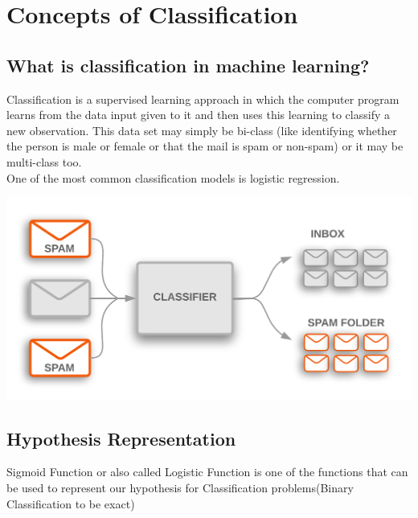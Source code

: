 \documentclass{42-en}
\begin{document}

\chapter{Concepts of Classification}
\section*{What is classification in machine learning?}

Classification is a supervised learning approach in which the computer program learns from the data input given to it and then uses this learning to classify a new observation. This data set may simply be bi-class (like identifying whether the person is male or female or that the mail is spam or non-spam) or it may be multi-class too.\\

One of the most common classification models is logistic regression.

\centerline{\includegraphics[width=150mm]{images/TextClassificationExample.png}}

\section*{Hypothesis Representation}

Sigmoid Function or also called Logistic Function is one of the functions that can be used to represent our hypothesis for Classification problems(Binary Classification to be exact)\\
\end{document}
